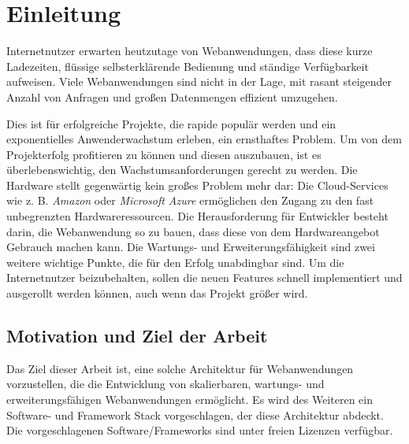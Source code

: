 \chapter{Einleitung}

Internetnutzer erwarten heutzutage von Webanwendungen, dass diese kurze Ladezeiten, flüssige selbsterklärende Bedienung und ständige Verfügbarkeit aufweisen. Viele Webanwendungen sind nicht in der Lage, mit rasant steigender Anzahl von Anfragen und großen Datenmengen effizient umzugehen.

Dies ist für erfolgreiche Projekte, die rapide populär werden und ein exponentielles Anwenderwachstum erleben, ein ernsthaftes Problem. Um von dem Projekterfolg profitieren zu können und diesen auszubauen, ist es überlebenswichtig, den Wachstumsanforderungen gerecht zu werden. Die Hardware stellt gegenwärtig kein großes Problem mehr dar: Die Cloud-Services wie z. B. \textit{Amazon} oder \textit{Microsoft Azure} ermöglichen den Zugang zu den fast unbegrenzten Hardwareressourcen. Die Herausforderung für Entwickler besteht darin, die Webanwendung so zu bauen, dass diese von dem Hardwareangebot Gebrauch machen kann. Die Wartungs- und Erweiterungsfähigkeit sind zwei weitere wichtige Punkte, die für den Erfolg unabdingbar sind. Um die Internetnutzer beizubehalten, sollen die neuen Features schnell implementiert und ausgerollt werden können, auch wenn das Projekt größer wird.

\section{Motivation und Ziel der Arbeit}

Das Ziel dieser Arbeit ist, eine solche Architektur für Webanwendungen vorzustellen, die die Entwicklung von skalierbaren, wartungs- und erweiterungsfähigen Webanwendungen ermöglicht. Es wird des Weiteren ein Software-  und Framework Stack vorgeschlagen, der diese Architektur abdeckt. Die vorgeschlagenen Software/Frameworks sind unter freien Lizenzen verfügbar.

